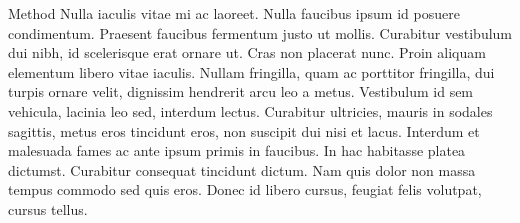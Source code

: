 Method Nulla iaculis vitae mi ac laoreet. Nulla faucibus ipsum id posuere condimentum. Praesent faucibus fermentum justo ut mollis. Curabitur vestibulum dui nibh, id scelerisque erat ornare ut. Cras non placerat nunc. Proin aliquam elementum libero vitae iaculis. Nullam fringilla, quam ac porttitor fringilla, dui turpis ornare velit, dignissim hendrerit arcu leo a metus. Vestibulum id sem vehicula, lacinia leo sed, interdum lectus. Curabitur ultricies, mauris in sodales sagittis, metus eros tincidunt eros, non suscipit dui nisi et lacus. Interdum et malesuada fames ac ante ipsum primis in faucibus. In hac habitasse platea dictumst. Curabitur consequat tincidunt dictum. Nam quis dolor non massa tempus commodo sed quis eros. Donec id libero cursus, feugiat felis volutpat, cursus tellus.